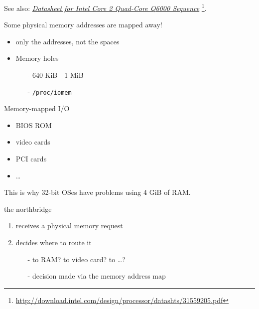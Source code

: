 See also:
\href{http://download.intel.com/design/processor/datashts/31559205.pdf}{\emph{Datasheet
    for Intel Core 2 Quad-Core Q6000 Sequence}}
\footnote{\url{http://download.intel.com/design/processor/datashts/31559205.pdf}}.

\begin{frame}[plain]
  \begin{minipage}{.65\linewidth}
    \begin{block}{Some physical memory addresses are mapped away!}
      \begin{itemize}
      \item only the addresses, not the spaces
      \item Memory holes
        \begin{itemize}
        \item[-] 640 KiB~~1 MiB
        \item[-] \texttt{/proc/iomem}
        \end{itemize}
      \end{itemize}
    \end{block}
    \begin{block}{Memory-mapped I/O}
      \begin{itemize}
      \item BIOS ROM
      \item video cards
      \item PCI cards
      \item \ldots
      \end{itemize}
      This is why 32-bit OSes have problems using 4 GiB of RAM.
    \end{block}
  \end{minipage}\quad
  \begin{minipage}{.3\linewidth}
  \end{minipage}
\end{frame}

\begin{frame}
  \begin{block}{the northbridge}
    \begin{enumerate}
    \item receives a physical memory request
    \item decides where to route it
      \begin{itemize}
      \item[-] to RAM? to video card? to \ldots{}?
      \item[-] decision made via the \alert{memory address map}
      \end{itemize}
    \end{enumerate}
  \end{block}
\end{frame}

